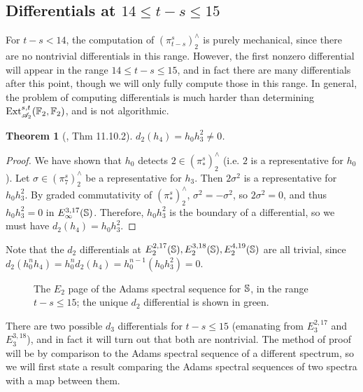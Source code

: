 \documentclass[11pt, titlepage]{article} %
\def\bb{\ensuremath\mathbb}
\def\A{\ensuremath{\mathscr{A}_2}}
\DeclareMathOperator{\Ext}{Ext}
\numberwithin{equation}{subsection}
\theoremstyle{plain}
\newtheorem{theorem}{Theorem}[subsection]
\theoremstyle{definition}
\begin{document}
\subsection{Differentials at \(14\leq t-s\leq 15\)}\label{2504291253}

For \(t-s<14\), the computation of \((\pi_{t-s}^s)^\wedge_2\) is purely mechanical, since there are no nontrivial differentials in this range.  However, the first nonzero differential will appear in the range \(14\leq t-s\leq15\), and in fact there are many differentials after this point, though we will only fully compute those in this range. In general, the problem of computing differentials is much harder than  determining \(\Ext_{\A}^{s,t}(\bb{F}_2, \bb{F}_2)\), and is not algorithmic. 

\begin{theorem}[{\autocite{rognes2}, Thm 11.10.2}]
\(d_2(h_4)=h_0h_3^2\neq 0\).
\end{theorem}

\begin{proof}
We have shown that \(h_0\) detects \(2\in (\pi_*^s)^\wedge_2\) (i.e. \(2\) is a representative for \(h_0\)). Let \(\sigma\in (\pi_7^s)^\wedge_2\) be a representative for \(h_3\). Then \(2 \sigma^2\) is a representative for \(h_0h_3^2\). By graded commutativity of \((\pi_*^s)^\wedge_2\), \(\sigma^2=-\sigma^2\), so \(2 \sigma^2=0\), and thus \(h_0h_3^2=0\) in \(E_\infty^{3,17}(\bb{S})\). Therefore, \(h_0h_3^2\) is the boundary of a differential, so we must have \(d_2(h_4)=h_0h_3^2\).
\end{proof}

Note that the \(d_2\) differentials at \(E_2^{2, 17}(\bb{S}),  E_2^{3, 18}(\bb{S}), E_2^{4, 19}(\bb{S})\) are all trivial, since \(d_2(h_0^nh_4)=h_0^nd_2(h_4)=h_0^{n-1}(h_0h_3^2)=0\). 

\begin{figure}
\centering

\caption{The \(E_2\) page of the Adams spectral sequence for \(\bb{S}\), in the range \(t-s\leq 15\); the unique \(d_2\) differential is shown in green.}
\label{2504241227}
\end{figure}

There are two possible \(d_3\) differentials for \(t-s\leq 15\) (emanating from \(E_3^{2,17}\) and \(E_3^{3,18}\)), and in fact it will turn out that both are nontrivial. The method of proof will be by comparison to the Adams spectral sequence of a different spectrum, so we will first state a result comparing the Adams spectral sequences of two spectra with a map between them.
\end{document}
